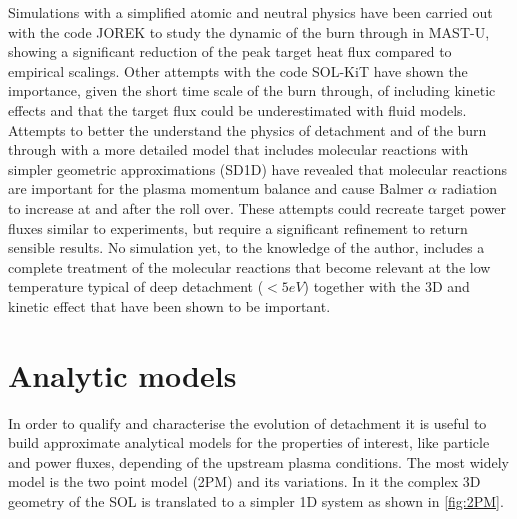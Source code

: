 Simulations with a simplified atomic and neutral physics have been carried out with the code JOREK to study the dynamic of the burn through in MAST-U, showing a significant reduction of the peak target heat flux compared to empirical scalings.\cite{Smith2020,Smith2020a} Other attempts with the code SOL-KiT have shown the importance, given the short time scale of the burn through, of including kinetic effects and that the target flux could be underestimated with fluid models.\cite{Mijin2020}
Attempts to better the understand the physics of detachment and of the burn through with a more detailed model that includes molecular reactions with simpler geometric approximations (SD1D) have revealed that molecular reactions are important for the plasma momentum balance and cause Balmer $\alpha$ radiation to increase at and after the roll over.\cite{Zhou2022} 
These attempts could recreate target power fluxes similar to experiments, but require a significant refinement to return sensible results.\cite{Tskhakaya2009} No simulation yet, to the knowledge of the author, includes a complete treatment of the molecular reactions that become relevant at the low temperature typical of deep detachment ($<5eV$) together with the 3D and kinetic effect that have been shown to be important.

\section{Analytic models}\label{Analytic models}

In order to qualify and characterise the evolution of detachment it is useful to build approximate analytical models for the properties of interest, like particle and power fluxes, depending of the upstream plasma conditions. The most widely model is the two point model (2PM) and its variations.\cite{HOBBS1966,Hobbs1967,Mahdavi1981,Keilhacker1982,Harbour1984,Lackner1984,Stangeby2001} In it the complex 3D geometry of the SOL is translated to a simpler 1D system as shown in \autoref{fig:2PM}.

